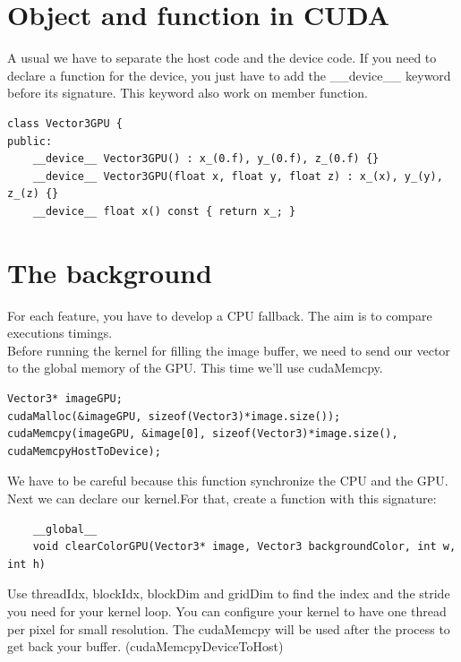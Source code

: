 \documentclass{article}
\begin{document}
\section{Object and function in CUDA}
A usual we have to separate the host code and the device code. If you need to declare a function for the device, you just have to add the \_\_device\_\_ keyword before its signature. This keyword also work on member function.
\begin{lstlisting}
class Vector3GPU {
public:
	__device__ Vector3GPU() : x_(0.f), y_(0.f), z_(0.f) {}
	__device__ Vector3GPU(float x, float y, float z) : x_(x), y_(y), z_(z) {}
	__device__ float x() const { return x_; }
\end{lstlisting}

\section{The background}
For each feature, you have to develop a CPU fallback. The aim is to compare executions timings.\\
Before running the kernel for filling the image buffer, we need to send our vector to the global memory of the GPU. This time we'll use cudaMemcpy.
\begin{lstlisting}
Vector3* imageGPU;
cudaMalloc(&imageGPU, sizeof(Vector3)*image.size());
cudaMemcpy(imageGPU, &image[0], sizeof(Vector3)*image.size(), cudaMemcpyHostToDevice);
\end{lstlisting}
We have to be careful because this function synchronize the CPU and the GPU.\\
Next we can declare our kernel.For that, create a function with this signature:
\begin{lstlisting}
	__global__
	void clearColorGPU(Vector3* image, Vector3 backgroundColor, int w, int h)
\end{lstlisting}
Use threadIdx, blockIdx, blockDim and gridDim to find the index and the stride you need for your kernel loop. You can configure your kernel to have one thread per pixel for small resolution.
The cudaMemcpy will be used after the process to get back your buffer. (cudaMemcpyDeviceToHost)
\end{document}
